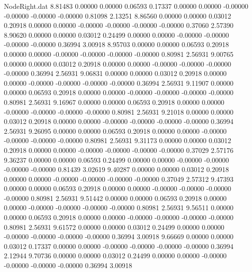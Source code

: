 \begin{filecontents}{NodeRight.dat}
   8.81483    0.00000    0.00000     0.06593    0.17337    0.00000    0.00000   -0.00000   -0.00000   -0.00000   -0.00000    0.81098    2.13251
   8.86560    0.00000    0.00000     0.03012    0.20918    0.00000    0.00000   -0.00000   -0.00000   -0.00000   -0.00000    0.37060    2.57390
   8.90620    0.00000    0.00000     0.03012    0.24499    0.00000    0.00000   -0.00000   -0.00000   -0.00000   -0.00000    0.36994    3.00918
   8.95703    0.00000    0.00000     0.06593    0.20918    0.00000    0.00000   -0.00000   -0.00000   -0.00000   -0.00000    0.80981    2.56931
   9.00765    0.00000    0.00000     0.03012    0.20918    0.00000    0.00000   -0.00000   -0.00000   -0.00000   -0.00000    0.36994    2.56931
   9.06831    0.00000    0.00000     0.03012    0.20918    0.00000    0.00000   -0.00000   -0.00000   -0.00000   -0.00000    0.36994    2.56931
   9.11907    0.00000    0.00000     0.06593    0.20918    0.00000    0.00000   -0.00000   -0.00000   -0.00000   -0.00000    0.80981    2.56931
   9.16967    0.00000    0.00000     0.06593    0.20918    0.00000    0.00000   -0.00000   -0.00000   -0.00000   -0.00000    0.80981    2.56931
   9.21018    0.00000    0.00000     0.03012    0.20918    0.00000    0.00000   -0.00000   -0.00000   -0.00000   -0.00000    0.36994    2.56931
   9.26095    0.00000    0.00000     0.06593    0.20918    0.00000    0.00000   -0.00000   -0.00000   -0.00000   -0.00000    0.80981    2.56931
   9.31173    0.00000    0.00000     0.03012    0.20918    0.00000    0.00000   -0.00000   -0.00000   -0.00000   -0.00000    0.37029    2.57176
   9.36237    0.00000    0.00000     0.06593    0.24499    0.00000    0.00000   -0.00000   -0.00000   -0.00000   -0.00000    0.81439    3.02619
   9.40287    0.00000    0.00000     0.03012    0.20918    0.00000    0.00000   -0.00000   -0.00000   -0.00000   -0.00000    0.37049    2.57312
   9.47393    0.00000    0.00000     0.06593    0.20918    0.00000    0.00000   -0.00000   -0.00000   -0.00000   -0.00000    0.80981    2.56931
   9.51442    0.00000    0.00000     0.06593    0.20918    0.00000    0.00000   -0.00000   -0.00000   -0.00000   -0.00000    0.80981    2.56931
   9.56511    0.00000    0.00000     0.06593    0.20918    0.00000    0.00000   -0.00000   -0.00000   -0.00000   -0.00000    0.80981    2.56931
   9.61572    0.00000    0.00000     0.03012    0.24499    0.00000    0.00000   -0.00000   -0.00000   -0.00000   -0.00000    0.36994    3.00918
   9.66669    0.00000    0.00000     0.03012    0.17337    0.00000    0.00000   -0.00000   -0.00000   -0.00000   -0.00000    0.36994    2.12944
   9.70736    0.00000    0.00000     0.03012    0.24499    0.00000    0.00000   -0.00000   -0.00000   -0.00000   -0.00000    0.36994    3.00918

\end{filecontents}
